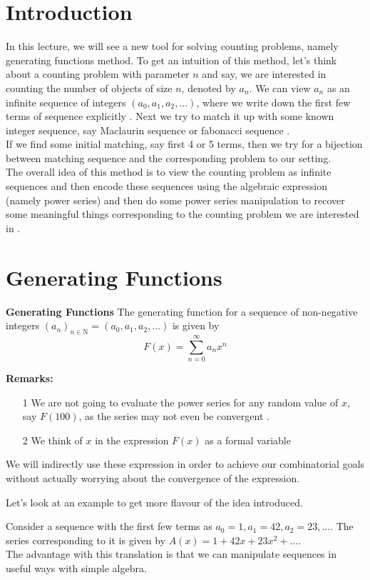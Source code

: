 \section{Introduction}
In this lecture, we will see a new tool for solving counting problems, namely generating functions method. To get an intuition of this method, let's think about a counting problem with parameter $n$ and say, we are interested in counting the number of objects of size $n$, denoted  by $a_n$. We can view $a_n$ as an infinite sequence of integers $(a_0,a_1,a_2,\dots)$, where we write down  the first few terms of sequence explicitly . Next we try to match it up with some known integer sequence, say Maclaurin sequence or fabonacci sequence . \\
If we find some initial matching, say first 4 or 5 terms, then we try for a bijection between matching sequence and the corresponding problem to our setting.\\
The overall idea of this method is to view the counting problem as infinite sequences and then encode these sequences using the algebraic expression (namely power series) and then do some power series manipulation to recover some meaningful things corresponding to the counting problem we are interested in .
\section{Generating Functions}
\begin{definition}\textbf{Generating Functions}
The generating function for a sequence of non-negative integers $(a_n)_{n\in \mathrm{N}}=(a_0,a_1,a_2,\dots)$ is given by $$F(x)=\sum_{n=0}^{\infty}a_nx^n$$
\end{definition}
\textbf{Remarks:}
\begin{itemize}
    \item[1] We are not going to evaluate the power series for any random value of $x$, say $F(100)$, as the series may not even be convergent . 
\item[2] We think of $x$ in the expression $F(x)$ as a formal variable
\end{itemize}
We will indirectly use these expression in order to achieve our combinatorial goals without actually worrying about the convergence of the expression.

\noindent Let's look at an example to get more flavour of the idea introduced.

Consider a sequence with the first few terms as $a_0=1,a_1=42,a_2=23,\dots$.
The series corresponding to it is given by $A(x)=1+42x+23x^2+\dots$.
\\The advantage with this translation is that we can manipulate sequences in useful ways with simple algebra. 
 
